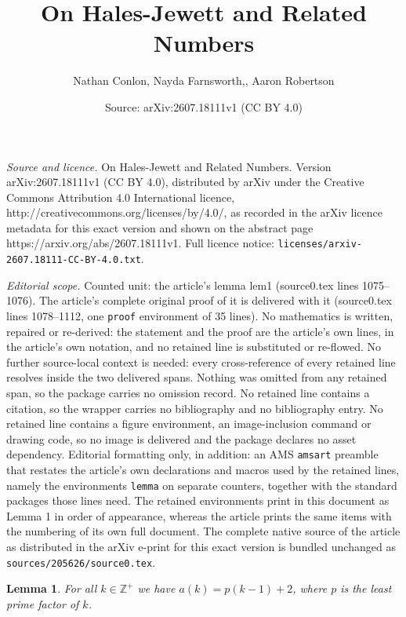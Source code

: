 \documentclass[10pt,a4paper]{amsart}
\title{On Hales-Jewett and Related Numbers}
\author{Nathan Conlon, Nayda Farnsworth,, Aaron Robertson}
\date{Source: arXiv:2607.18111v1 (CC BY 4.0)}
\newtheorem{lemma}{Lemma}
\begin{document}
\maketitle

\noindent\emph{Source and licence.} On Hales-Jewett and Related Numbers. Version arXiv:2607.18111v1 (CC BY 4.0), distributed by arXiv under the Creative Commons Attribution 4.0 International licence, http://creativecommons.org/licenses/by/4.0/, as recorded in the arXiv licence metadata for this exact version and shown on the abstract page https://arxiv.org/abs/2607.18111v1. Full licence notice: \texttt{licenses/arxiv-2607.18111-CC-BY-4.0.txt}.\par\smallskip

\noindent\textit{Editorial scope.} Counted unit: the article's lemma lem1 (source0.tex lines 1075--1076). The article's complete original proof of it is delivered with it (source0.tex lines 1078--1112, one \texttt{proof} environment of 35 lines). No mathematics is written, repaired or re-derived: the statement and the proof are the article's own lines, in the article's own notation, and no retained line is substituted or re-flowed.  No further source-local context is needed: every cross-reference of every retained line resolves inside the two delivered spans.  Nothing was omitted from any retained span, so the package carries no omission record.  No retained line contains a citation, so the wrapper carries no bibliography and no bibliography entry.  No retained line contains a figure environment, an image-inclusion command or drawing code, so no image is delivered and the package declares no asset dependency.  Editorial formatting only, in addition: an AMS \texttt{amsart} preamble that restates the article's own declarations and macros used by the retained lines, namely the environments \texttt{lemma} on separate counters, together with the standard packages those lines need.  The retained environments print in this document as Lemma 1 in order of appearance, whereas the article prints the same items with the numbering of its own full document.  The complete native source of the article as distributed in the arXiv e-print for this exact version is bundled unchanged as \texttt{sources/205626/source0.tex}.
\begin{lemma}\label{lem1} For all $k\in\mathbb{Z}^+$ we have $a(k) = p(k-1)+2$, where $p$ is the least prime factor of $k$.
\end{lemma}
\end{document}
